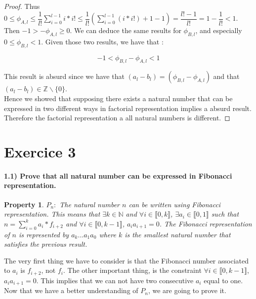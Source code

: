 \documentclass{article}
\newtheorem{prop}{Property}
\begin{document}
\begin{proof}
Thus $0 \leq \phi_{A, l} \leq \dfrac{1}{l!}\displaystyle\sum_{i=0}^{l-1} i*i! \leq \dfrac{1}{l!}(\displaystyle\sum_{i=0}^{l-1} (i*i!) +1 -1) = \dfrac{l!-1}{l!} = 1-\dfrac{1}{l!} < 1$. Then $-1 > -\phi_{A, l} \geq 0$. We can deduce the same results for $\phi_{B, l}$, and especially $0 \leq \phi_{B, l} < 1$. Given those two results, we have that :

\begin{equation*}
  -1 < \phi_{B, l}-\phi_{A, l} < 1
\end{equation*}

This result is absurd since we have that $(a_l-b_l) = (\phi_{B, l}-\phi_{A, l})$ and that $(a_l-b_l) \in \mathbb{Z}\backslash \{0\}$. \\

Hence we showed that supposing there exists a natural number that can be expressed in two different ways in factorial representation implies a absurd result. Therefore the factorial representation a all natural numbers is different.

\end{proof}

\section*{Exercice 3}

\paragraph{1.1) Prove that all natural number can be expressed in Fibonacci representation.}

\begin{prop}
  $P_n : $ The natural number $n$ can be written using Fibonacci representation. This means that $\exists k \in \mathbb{N}$ and $\forall i \in \llbracket 0, k\rrbracket$, $ \exists a_i \in \llbracket 0, 1\rrbracket$ such that $n = \displaystyle\sum_{i=0}^k a_i*f_{i+2}$ and $\forall i \in \llbracket 0, k-1\rrbracket$, $a_ia_{i+1} = 0$. The Fibonacci representation of $n$ is represented by $a_k...a_1a_0$ where $k$ is the smallest natural number that satisfies the previous result.
\end{prop}

The very first thing we have to consider is that the Fibonacci number associated to $a_i$ is $f_{i+2}$, not $f_i$. The other important thing, is the constraint $\forall i \in \llbracket 0, k-1\rrbracket$, $a_ia_{i+1} = 0$. This implies that we can not have two consecutive $a_i$ equal to one. Now that we have a better understanding of $P_n$, we are going to prove it.\\
\end{document}
